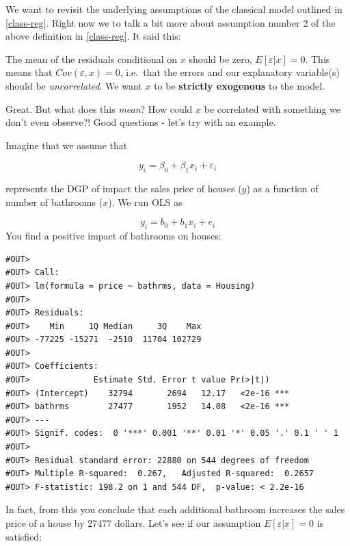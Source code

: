 \documentclass[]{book}
\newenvironment{Shaded}{\begin{snugshade}}{\end{snugshade}}
\newcommand{\KeywordTok}[1]{\textcolor[rgb]{0.13,0.29,0.53}{\textbf{#1}}}
\newcommand{\DataTypeTok}[1]{\textcolor[rgb]{0.13,0.29,0.53}{#1}}
\newcommand{\StringTok}[1]{\textcolor[rgb]{0.31,0.60,0.02}{#1}}
\newcommand{\CommentTok}[1]{\textcolor[rgb]{0.56,0.35,0.01}{\textit{#1}}}
\newcommand{\OperatorTok}[1]{\textcolor[rgb]{0.81,0.36,0.00}{\textbf{#1}}}
\newcommand{\NormalTok}[1]{#1}
\newenvironment{warning}{\begin{tcolorbox}[colback=orange!5!white,colframe=orange,title=\textbf{Warning!}]}{\end{tcolorbox}}
\theoremstyle{definition}
\theoremstyle{definition}
\theoremstyle{definition}
\theoremstyle{remark}
\begin{document}
We want to revisit the underlying assumptions of the classical model
outlined in \ref{class-reg}. Right now we to talk a bit more about
assumption number 2 of the above definition in \ref{class-reg}. It said
this:

\begin{warning}
The mean of the residuals conditional on \(x\) should be zero,
\(E[\varepsilon|x] = 0\). This means that \(Cov(\varepsilon,x) = 0\),
i.e.~that the errors and our explanatory variable(s) should be
\emph{uncorrelated}. We want \(x\) to be \textbf{strictly exogenous} to
the model.
\end{warning}

 Great. But what does this \emph{mean}? How could \(x\) be correlated
with something we don't even observe?! Good questions - let's try with
an example.

Imagine that we assume that

\[
y_i = \beta_0 + \beta_1 x_i + \varepsilon_i \label{eq:DGP-h}
\]

represents the DGP of impact the sales price of houses (\(y\)) as a
function of number of bathrooms (\(x\)). We run OLS as

\[
y_i = b_0 + b_1 x_i + e_i 
\] You find a positive impact of bathrooms on houses:

\begin{verbatim}
#OUT> 
#OUT> Call:
#OUT> lm(formula = price ~ bathrms, data = Housing)
#OUT> 
#OUT> Residuals:
#OUT>    Min     1Q Median     3Q    Max 
#OUT> -77225 -15271  -2510  11704 102729 
#OUT> 
#OUT> Coefficients:
#OUT>             Estimate Std. Error t value Pr(>|t|)    
#OUT> (Intercept)    32794       2694   12.17   <2e-16 ***
#OUT> bathrms        27477       1952   14.08   <2e-16 ***
#OUT> ---
#OUT> Signif. codes:  0 '***' 0.001 '**' 0.01 '*' 0.05 '.' 0.1 ' ' 1
#OUT> 
#OUT> Residual standard error: 22880 on 544 degrees of freedom
#OUT> Multiple R-squared:  0.267,   Adjusted R-squared:  0.2657 
#OUT> F-statistic: 198.2 on 1 and 544 DF,  p-value: < 2.2e-16
\end{verbatim}

In fact, from this you conclude that each additional bathroom increases
the sales price of a house by 27477 dollars. Let's see if our assumption
\(E[\varepsilon|x] = 0\) is satisfied:

\begin{Shaded}
\end{Shaded}
\end{document}
